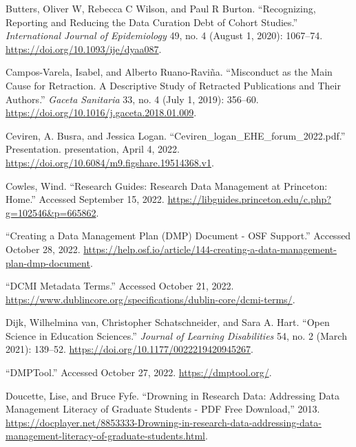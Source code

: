 \documentclass[
]{book}
\newlength{\cslhangindent}
\newlength{\cslentryspacingunit} %
\newenvironment{CSLReferences}[2] %
 {%
  \setlength{\parindent}{0pt}
  \ifodd #1
  \let\oldpar\par
  \def\par{\hangindent=\cslhangindent\oldpar}
  \fi
  \setlength{\parskip}{#2\cslentryspacingunit}
 }%
 {}
\begin{document}
\begin{CSLReferences}{1}{0}
\leavevmode{}%
Butters, Oliver W, Rebecca C Wilson, and Paul R Burton. {``Recognizing, Reporting and Reducing the Data Curation Debt of Cohort Studies.''} \emph{International Journal of Epidemiology} 49, no. 4 (August 1, 2020): 1067--74. \url{https://doi.org/10.1093/ije/dyaa087}.

\leavevmode{}%
Campos-Varela, Isabel, and Alberto Ruano-Raviña. {``Misconduct as the Main Cause for Retraction. A Descriptive Study of Retracted Publications and Their Authors.''} \emph{Gaceta Sanitaria} 33, no. 4 (July 1, 2019): 356--60. \url{https://doi.org/10.1016/j.gaceta.2018.01.009}.

\leavevmode{}%
Ceviren, A. Busra, and Jessica Logan. {``Ceviren\_logan\_EHE\_forum\_2022.pdf.''} Presentation. presentation, April 4, 2022. \url{https://doi.org/10.6084/m9.figshare.19514368.v1}.

\leavevmode{}%
Cowles, Wind. {``Research Guides: Research Data Management at Princeton: Home.''} Accessed September 15, 2022. \url{https://libguides.princeton.edu/c.php?g=102546\&p=665862}.

\leavevmode{}%
{``Creating a Data Management Plan ({DMP}) Document - {OSF} Support.''} Accessed October 28, 2022. \url{https://help.osf.io/article/144-creating-a-data-management-plan-dmp-document}.

\leavevmode{}%
{``{DCMI} Metadata Terms.''} Accessed October 21, 2022. \url{https://www.dublincore.org/specifications/dublin-core/dcmi-terms/}.

\leavevmode{}%
Dijk, Wilhelmina van, Christopher Schatschneider, and Sara A. Hart. {``Open Science in Education Sciences.''} \emph{Journal of Learning Disabilities} 54, no. 2 (March 2021): 139--52. \url{https://doi.org/10.1177/0022219420945267}.

\leavevmode{}%
{``{DMPTool}.''} Accessed October 27, 2022. \url{https://dmptool.org/}.

\leavevmode{}%
Doucette, Lise, and Bruce Fyfe. {``Drowning in Research Data: Addressing Data Management Literacy of Graduate Students - {PDF} Free Download,''} 2013. \url{https://docplayer.net/8853333-Drowning-in-research-data-addressing-data-management-literacy-of-graduate-students.html}.


\end{CSLReferences}
\end{document}
